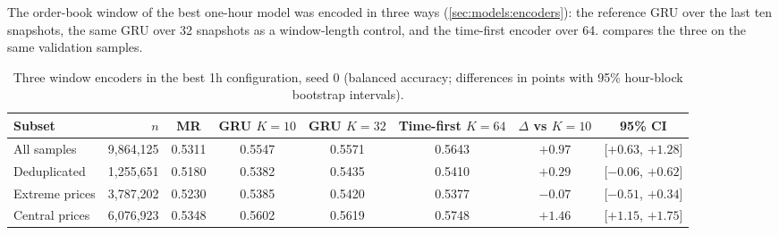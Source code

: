The order-book window of the best one-hour model was encoded in three ways
(\cref{sec:models:encoders}): the reference GRU over the last ten snapshots, the same GRU
over 32 snapshots as a window-length control, and the time-first encoder over 64.
 compares the three on the same validation samples.

\begin{table}[t]
\centering
\caption{Three window encoders in the best 1h configuration, seed 0 (balanced accuracy;
differences in points with 95\% hour-block bootstrap intervals).}
\label{tab:exp:encoders}
\small
\begin{fittable}\begin{tabular}{lrcccccc}
\toprule
Subset & $n$ & MR & GRU $K{=}10$ & GRU $K{=}32$ & Time-first $K{=}64$ & $\Delta$ vs $K{=}10$ & 95\% CI \\
\midrule
All samples    & 9{,}864{,}125 & 0.5311 & 0.5547 & 0.5571 & 0.5643 & $+0.97$ & [$+0.63$, $+1.28$] \\
Deduplicated   & 1{,}255{,}651 & 0.5180 & 0.5382 & 0.5435 & 0.5410 & $+0.29$ & [$-0.06$, $+0.62$] \\
Extreme prices & 3{,}787{,}202 & 0.5230 & 0.5385 & 0.5420 & 0.5377 & $-0.07$ & [$-0.51$, $+0.34$] \\
Central prices & 6{,}076{,}923 & 0.5348 & 0.5602 & 0.5619 & 0.5748 & $+1.46$ & [$+1.15$, $+1.75$] \\
\bottomrule
\end{tabular}\end{fittable}
\end{table}

